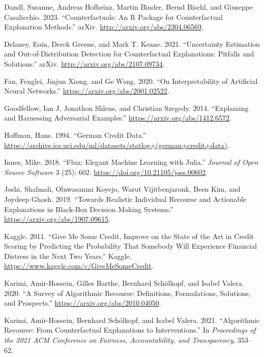 \documentclass{juliacon}
\newlength{\cslhangindent}
\newenvironment{CSLReferences}[2] %
 {\begin{list}{}{%
  \setlength{\itemindent}{0pt}
  \setlength{\leftmargin}{0pt}
  \setlength{\parsep}{0pt}
  \ifodd #1
   \setlength{\leftmargin}{\cslhangindent}
   \setlength{\itemindent}{-1\cslhangindent}
  \fi
  \setlength{\itemsep}{#2\baselineskip}}}
 {\end{list}}
\begin{document}
\begin{CSLReferences}{1}{0}
Dandl, Susanne, Andreas Hofheinz, Martin Binder, Bernd Bischl, and
Giuseppe Casalicchio. 2023. {``Counterfactuals: {An} {R} {Package} for
{Counterfactual} {Explanation} {Methods}.''} arXiv.
\url{http://arxiv.org/abs/2304.06569}.

Delaney, Eoin, Derek Greene, and Mark T. Keane. 2021. {``Uncertainty
{Estimation} and {Out}-of-{Distribution} {Detection} for
{Counterfactual} {Explanations}: {Pitfalls} and {Solutions}.''} arXiv.
\url{http://arxiv.org/abs/2107.09734}.

Fan, Fenglei, Jinjun Xiong, and Ge Wang. 2020. {``On Interpretability of
Artificial Neural Networks.''} \url{https://arxiv.org/abs/2001.02522}.

Goodfellow, Ian J, Jonathon Shlens, and Christian Szegedy. 2014.
{``Explaining and Harnessing Adversarial Examples.''}
\url{https://arxiv.org/abs/1412.6572}.

Hoffman, Hans. 1994. {``German {Credit Data}.''}
\url{https://archive.ics.uci.edu/ml/datasets/statlog+(german+credit+data)}.

Innes, Mike. 2018. {``Flux: {Elegant} Machine Learning with {Julia}.''}
\emph{Journal of Open Source Software} 3 (25): 602.
\url{https://doi.org/10.21105/joss.00602}.

Joshi, Shalmali, Oluwasanmi Koyejo, Warut Vijitbenjaronk, Been Kim, and
Joydeep Ghosh. 2019. {``Towards Realistic Individual Recourse and
Actionable Explanations in Black-Box Decision Making Systems.''}
\url{https://arxiv.org/abs/1907.09615}.

Kaggle. 2011. {``Give Me Some Credit, {Improve} on the State of the Art
in Credit Scoring by Predicting the Probability That Somebody Will
Experience Financial Distress in the Next Two Years.''} {Kaggle}.
\url{https://www.kaggle.com/c/GiveMeSomeCredit}.

Karimi, Amir-Hossein, Gilles Barthe, Bernhard Schölkopf, and Isabel
Valera. 2020. {``A Survey of Algorithmic Recourse: Definitions,
Formulations, Solutions, and Prospects.''}
\url{https://arxiv.org/abs/2010.04050}.

Karimi, Amir-Hossein, Bernhard Schölkopf, and Isabel Valera. 2021.
{``Algorithmic Recourse: From Counterfactual Explanations to
Interventions.''} In \emph{Proceedings of the 2021 {ACM Conference} on
{Fairness}, {Accountability}, and {Transparency}}, 353--62.


\end{CSLReferences}
\end{document}
